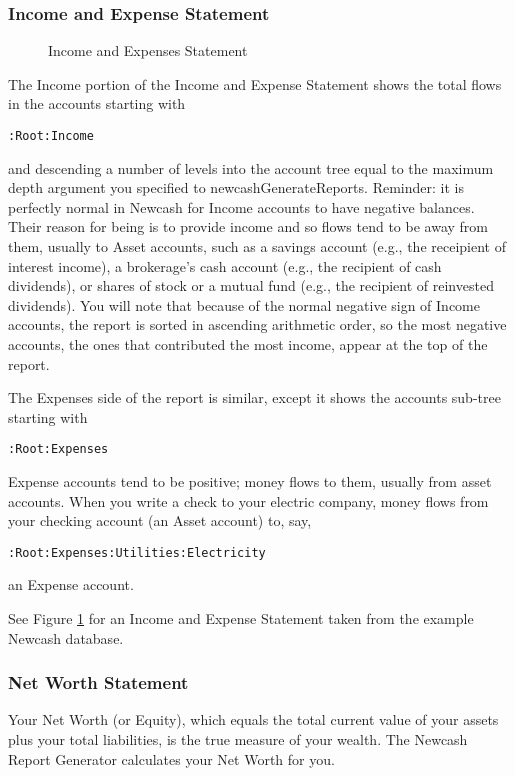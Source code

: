 \documentclass{report}
\newcommand{\graphicsfig}[5]{
\begin{figure}[#5]
\begin{center}
\resizebox{#1}{!}{\texttt{[image: \#2]}}
\end{center}
\caption{#3}
\label{#4}
\end{figure}
}
\begin{document}
\subsubsection{Income and Expense Statement}
\graphicsfig{5in}{figures/income_and_expenses_statement.png}{Income and Expenses Statement}{Income and Expenses Statement}{}
The Income portion of the Income and Expense Statement shows the total flows in the accounts starting with
\begin{verbatim}
:Root:Income
\end{verbatim}
and descending a number of levels into the account tree equal to the maximum depth argument you specified to newcashGenerateReports. Reminder: it is perfectly normal in Newcash for Income accounts to have negative balances. Their reason for being is to provide income and so flows tend to be away from them, usually to Asset accounts, such as a savings account (e.g., the receipient of interest income), a brokerage's cash account (e.g., the recipient of cash dividends), or shares of stock or a mutual fund (e.g., the recipient of reinvested dividends). You will note that because of the normal negative sign of Income accounts, the report is sorted in ascending arithmetic order, so the most negative accounts, the ones that contributed the most income, appear at the top of the report.

The Expenses side of the report is similar, except it shows the accounts sub-tree starting with 
\begin{verbatim}
:Root:Expenses
\end{verbatim}

Expense accounts tend to be positive; money flows to them, usually from asset accounts. When you write a check to your electric company, money flows from your checking account (an Asset account) to, say, 
\begin{verbatim}
:Root:Expenses:Utilities:Electricity
\end{verbatim}
an Expense account.

See Figure \ref{Income and Expenses Statement} for an Income and Expense Statement taken from the example Newcash database.

\subsubsection{Net Worth Statement}
Your Net Worth (or Equity), which equals the total current value of your assets plus your total liabilities, is the true measure of your wealth. The Newcash Report Generator calculates your Net Worth for you.
\end{document}
